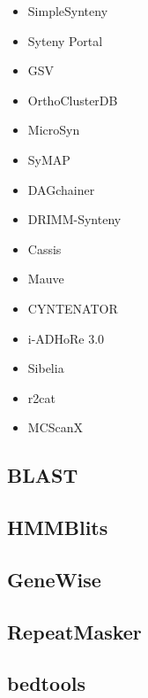 \begin{itemize}
  \item SimpleSynteny   \cite{veltri2016simplesynteny}
  \item Syteny Portal   \cite{lee2016synteny}
  \item GSV             \cite{revanna2011gsv}
  \item OrthoClusterDB  \cite{ng2009orthoclusterdb}
  \item MicroSyn        \cite{cai2011microsyn}
  \item SyMAP           \cite{soderlund2011symap}
  \item DAGchainer      \cite{haas2004dagchainer}
  \item DRIMM-Synteny   \cite{pham2010drimm}
  \item Cassis          \cite{baudet2010cassis}
  \item Mauve           \cite{darling2004mauve}
  \item CYNTENATOR      \cite{rodelsperger2010cyntenator}
  \item i-ADHoRe 3.0    \cite{proost2012adhore}
  \item Sibelia         \cite{minkin2013sibelia}
  \item r2cat           \cite{husemann2010r2cat}
  \item MCScanX         \cite{wang2012mcscanx}
\end{itemize}

\subsection{BLAST}

\subsection{HMMBlits}

\subsection{GeneWise}

\subsection{RepeatMasker}

\subsection{bedtools}

